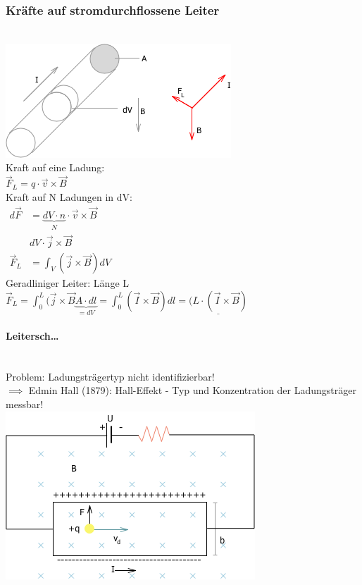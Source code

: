   \subsubsection{Kräfte auf stromdurchflossene Leiter}\leavevmode \\
  
        \includegraphics{skizzen/16/16_1B07}\\
        
        Kraft auf eine Ladung:\\
        $\vec{F}_L=q\cdot \vec{v}\times\vec{B}$\\
        
        Kraft auf N Ladungen in dV:\\
        $\begin{align}
        	d\vec{F}&= \underbrace{dV\cdot n}_{N}\cdot \vec{v}\times\vec{B}\\
        	&dV\cdot\vec{j}\times\vec{B}\\
        	\vec{F}_L&=\int_V(\vec{j}\times\vec{B})dV
        \end{align}$\\
        
        Geradliniger Leiter: Länge L\\
        
        $\vec{F}_L=\int_0^L(\vec{j}\times\vec{B}\underbrace{A\cdot dl}_{=dV}=\int_0^L(\vec{I}\times\vec{B})dl=\underline{(L\cdot(\vec{I}\times\vec{B})}$\\
        
        \paragraph{Leitersch…}\leavevmode \\
        Problem: Ladungsträgertyp nicht identifizierbar!\\
        $\implies$ Edmin Hall (1879): Hall-Effekt - Typ und Konzentration der Ladungsträger messbar!\\
        
        \includegraphics{skizzen/16/16_1B08}\\
        
